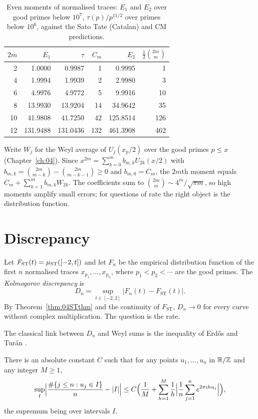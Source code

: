 \begin{table}[t]\centering\small
\begin{tabular}{rrrrrr}
\toprule
$2m$ & $E_1$ & $\tau$ & $C_m$ & $E_2$ & $\frac12\binom{2m}{m}$\\
\midrule
2 & 1.0000 & 0.9987 & 1 & 0.9995 & 1\\
4 & 1.9994 & 1.9939 & 2 & 2.9980 & 3\\
6 & 4.9976 & 4.9772 & 5 & 9.9916 & 10\\
8 & 13.9930 & 13.9204 & 14 & 34.9642 & 35\\
10 & 41.9808 & 41.7250 & 42 & 125.8514 & 126\\
12 & 131.9488 & 131.0436 & 132 & 461.3908 & 462\\
\bottomrule
\end{tabular}
\caption{Even moments of normalised traces: $E_1$ and $E_2$ over good primes below $10^7$, $\tau(p)/p^{11/2}$ over primes below $10^6$, against the Sato Tate (Catalan) and CM predictions.}\label{tab:05moments}
\end{table}

Write $W_j$ for the Weyl average of $U_j(x_p/2)$ over the good primes $p\le x$ (Chapter~\ref{ch:04}). Since $x^{2m} = \sum_{k=0}^m b_{m,k}U_{2k}(x/2)$ with $b_{m,k} = \binom{2m}{m-k} - \binom{2m}{m-k-1}\ge0$ and $b_{m,0} = C_m$, the $2m$th moment equals $C_m + \sum_{k=1}^m b_{m,k}W_{2k}$. The coefficients sum to $\binom{2m}{m}\sim4^m/\sqrt{\pi m}$, so high moments amplify small errors; for questions of rate the right object is the distribution function.

\section{Discrepancy}\label{sec:05disc}

Let $F_{\mathrm{ST}}(t) = \mu_{\mathrm{ST}}([-2,t])$ and let $F_n$ be the empirical distribution function of the first $n$ normalised traces $x_{p_1},\dots,x_{p_n}$, where $p_1<p_2<\cdots$ are the good primes. The \emph{Kolmogorov discrepancy} is
\[
D_n = \sup_{t\in[-2,2]}\bigl|F_n(t) - F_{\mathrm{ST}}(t)\bigr| .
\]
By Theorem~\ref{thm:04STthm} and the continuity of $F_{\mathrm{ST}}$, $D_n\to0$ for every curve without complex multiplication. The question is the rate.

The classical link between $D_n$ and Weyl sums is the inequality of Erd\H{o}s and Tur\'an \cite{erdosturan1948}.

\begin{theorem}
There is an absolute constant $C$ such that for any points $u_1,\dots,u_n$ in $\mathbb{R}/\mathbb{Z}$ and any integer $M\ge1$,
\[
\sup_{I}\Bigl|\frac{\#\{j\le n: u_j\in I\}}{n} - |I|\Bigr| \le C\Bigl(\frac{1}{M} + \sum_{h=1}^M \frac1h\Bigl|\frac1n\sum_{j=1}^n e^{2\pi i h u_j}\Bigr|\Bigr),
\]
the supremum being over intervals $I$.
\end{theorem}

